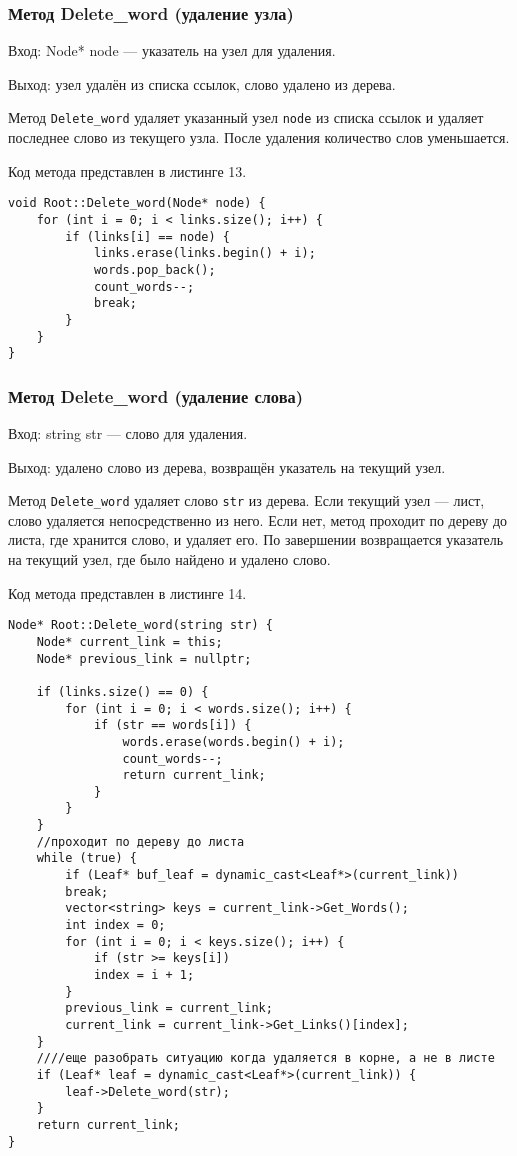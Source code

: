 \documentclass[10pt,a4paper,final]{article} %
\begin{document}
\subsubsection{Метод Delete\_word (удаление узла)}
Вход: Node* node — указатель на узел для удаления. \par
Выход: узел удалён из списка ссылок, слово удалено из дерева. \par
\par Метод \texttt{Delete\_word} удаляет указанный узел \texttt{node} из списка ссылок и удаляет последнее слово из текущего узла. После удаления количество слов уменьшается.

Код метода представлен в листинге 13. \begin{lstlisting}[label=deleteWordMethod, caption = Метод Delete\_word] 
void Root::Delete_word(Node* node) {
	for (int i = 0; i < links.size(); i++) {
		if (links[i] == node) {
			links.erase(links.begin() + i);
			words.pop_back();
			count_words--;
			break;
		}
	}
}
\end{lstlisting}


\subsubsection{Метод Delete\_word (удаление слова)}
Вход: string str — слово для удаления. \par
Выход: удалено слово из дерева, возвращён указатель на текущий узел. \par
\par Метод \texttt{Delete\_word} удаляет слово \texttt{str} из дерева. Если текущий узел — лист, слово удаляется непосредственно из него. Если нет, метод проходит по дереву до листа, где хранится слово, и удаляет его. По завершении возвращается указатель на текущий узел, где было найдено и удалено слово.

Код метода представлен в листинге 14. \begin{lstlisting}[label=deleteWordWithLinkMethod, caption = Метод Delete\_word] 
Node* Root::Delete_word(string str) {
	Node* current_link = this;
	Node* previous_link = nullptr;
	
	if (links.size() == 0) {
		for (int i = 0; i < words.size(); i++) {
			if (str == words[i]) {
				words.erase(words.begin() + i);
				count_words--;
				return current_link;
			}
		}
	}
	//проходит по дереву до листа
	while (true) {
		if (Leaf* buf_leaf = dynamic_cast<Leaf*>(current_link))
		break;
		vector<string> keys = current_link->Get_Words();
		int index = 0;
		for (int i = 0; i < keys.size(); i++) {
			if (str >= keys[i])
			index = i + 1;
		}
		previous_link = current_link;
		current_link = current_link->Get_Links()[index];
	}
	////еще разобрать ситуацию когда удаляется в корне, а не в листе
	if (Leaf* leaf = dynamic_cast<Leaf*>(current_link)) {
		leaf->Delete_word(str);
	}
	return current_link;
}\end{lstlisting}
\end{document}

